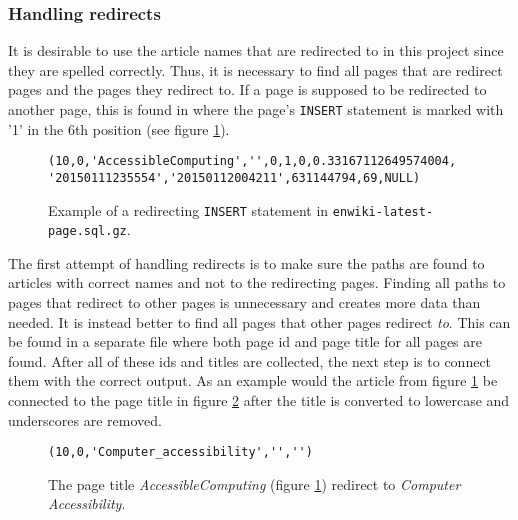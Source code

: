 \subsubsection{Handling redirects}
It is desirable to use the article names that are redirected to in this project since they are spelled correctly. Thus, it is necessary to find all pages that are redirect pages and the pages they redirect to. 
If a page is supposed to be redirected to another page, this is found in \enwikipage where the page's \texttt{INSERT} statement is marked with '1' in the 6th position (see figure \ref{fig:isredirect}).

\begin{figure}[h]
\centering
\begin{lstlisting}
(10,0,'AccessibleComputing','',0,1,0,0.33167112649574004,
'20150111235554','20150112004211',631144794,69,NULL)
\end{lstlisting}
\caption{Example of a redirecting \texttt{INSERT} statement in \texttt{enwiki-latest-page.sql.gz}.} 
\label{fig:isredirect}
\end{figure}
The first attempt of handling redirects is to make sure the paths are found to articles with correct names and not to the redirecting pages. Finding all paths to pages that redirect to other pages is unnecessary and creates more data than needed. It is instead better to find all pages that other pages redirect \emph{to}. This can be found in a separate file \enwikiredirect where both page id and page title for all pages are found. After all of these ids and titles are collected, the next step is to connect them with the correct output. As an example would the article from figure \ref{fig:isredirect} be connected to the page title in figure \ref{fig:correctacccomp} after the title is converted to lowercase and underscores are removed. 

\begin{figure}[h]
\centering
\begin{lstlisting}
(10,0,'Computer_accessibility','','')
\end{lstlisting}
\caption[Example of a page redirecting to]{The page title \emph{AccessibleComputing} (figure \ref{fig:isredirect}) redirect to \emph{Computer Accessibility}.}
\label{fig:correctacccomp}
\end{figure}



%

